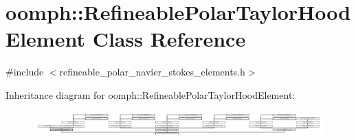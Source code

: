 \hypertarget{classoomph_1_1RefineablePolarTaylorHoodElement}{}\section{oomph\+:\+:Refineable\+Polar\+Taylor\+Hood\+Element Class Reference}
\label{classoomph_1_1RefineablePolarTaylorHoodElement}


{\ttfamily \#include $<$refineable\+\_\+polar\+\_\+navier\+\_\+stokes\+\_\+elements.\+h$>$}

Inheritance diagram for oomph\+:\+:Refineable\+Polar\+Taylor\+Hood\+Element\+:\begin{figure}[H]
\begin{center}
\leavevmode
\includegraphics[height=0.992908cm]{classoomph_1_1RefineablePolarTaylorHoodElement}
\end{center}
\end{figure}
